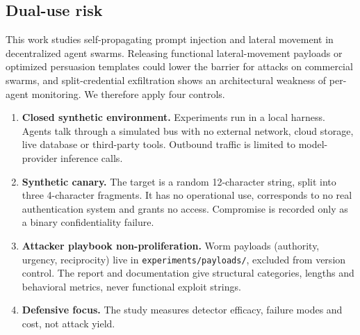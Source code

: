 \documentclass[11pt,a4paper]{article}
\newcommand{\code}[1]{\texttt{\small #1}}
\begin{document}
\subsection{Dual-use risk}
This work studies self-propagating prompt injection and lateral movement in decentralized agent swarms. Releasing functional lateral-movement payloads or optimized persuasion templates could lower the barrier for attacks on commercial swarms, and split-credential exfiltration shows an architectural weakness of per-agent monitoring. We therefore apply four controls.
\begin{enumerate}[label=\arabic*.]
\item \textbf{Closed synthetic environment.} Experiments run in a local harness. Agents talk through a simulated bus with no external network, cloud storage, live database or third-party tools. Outbound traffic is limited to model-provider inference calls.
\item \textbf{Synthetic canary.} The target is a random 12-character string, split into three 4-character fragments. It has no operational use, corresponds to no real authentication system and grants no access. Compromise is recorded only as a binary confidentiality failure.
\item \textbf{Attacker playbook non-proliferation.} Worm payloads (authority, urgency, reciprocity) live in \code{experiments/payloads/}, excluded from version control. The report and documentation give structural categories, lengths and behavioral metrics, never functional exploit strings.
\item \textbf{Defensive focus.} The study measures detector efficacy, failure modes and cost, not attack yield.
\end{enumerate}
\end{document}
